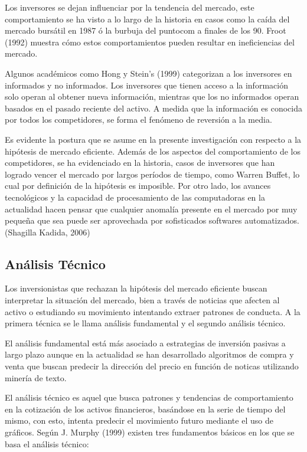 \documentclass[a4paper,12pt]{Latex/Classes/PhDthesisPSnPDF}
\begin{document}
Los inversores se dejan influenciar por la tendencia del mercado, este comportamiento se ha visto a lo largo de la historia en casos como la caída del mercado bursátil en 1987 ó la burbuja del puntocom a finales de los 90. Froot (1992) muestra cómo estos comportamientos pueden resultar en ineficiencias del mercado.

Algunos académicos como Hong y Stein's (1999) categorizan a los inversores en informados y no informados. Los inversores que tienen acceso a la información solo operan al obtener nueva información, mientras que los no informados operan basados en el pasado reciente del activo. A medida que la información es conocida por todos los competidores, se forma el fenómeno de reversión a la media.

Es evidente la postura que se asume en la presente investigación con respecto a la hipótesis de mercado eficiente. Además de los aspectos del comportamiento de los competidores, se ha evidenciado en la historia, casos de inversores que han logrado vencer el mercado por largos períodos de tiempo, como Warren Buffet, lo cual por definición de la hipótesis es imposible. Por otro lado, los avances tecnológicos y la capacidad de procesamiento de las computadoras en la actualidad hacen pensar que cualquier anomalía presente en el mercado por muy pequeña que sea puede ser aprovechada por sofisticados softwares automatizados. (Shagilla Kadida, 2006)

\subsection{Análisis Técnico}

Los inversionistas que rechazan la hipótesis del mercado eficiente buscan interpretar la situación del mercado, bien a través de noticias que afecten al activo o estudiando su movimiento intentando extraer patrones de conducta. A la primera técnica se le llama análisis fundamental y el segundo análisis técnico. 

El análisis fundamental está más asociado a estrategias de inversión pasivas a largo plazo aunque en la actualidad se han desarrollado algoritmos de compra y venta que buscan predecir la dirección del precio en función de noticas utilizando minería de texto.

El análisis técnico es aquel que busca patrones y tendencias de comportamiento en la cotización de los activos financieros, basándose en la serie de tiempo del mismo, con esto, intenta predecir el movimiento futuro mediante el uso de gráficos. Según J. Murphy (1999) existen tres fundamentos básicos en los que se basa el análisis técnico:
\end{document}

